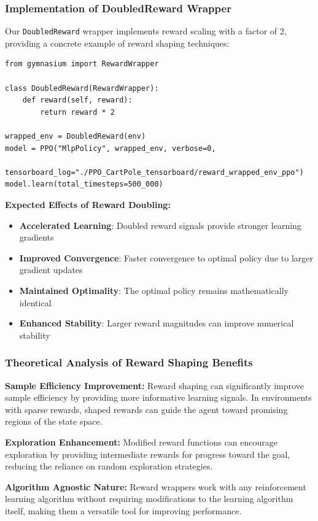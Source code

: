\documentclass[12pt]{article}
\begin{document}
{{{\subsubsection{Implementation of DoubledReward Wrapper}

Our \texttt{DoubledReward} wrapper implements reward scaling with a factor of 2, providing a concrete example of reward shaping techniques:

\begin{verbatim}
from gymnasium import RewardWrapper

class DoubledReward(RewardWrapper):
    def reward(self, reward):
        return reward * 2

wrapped_env = DoubledReward(env)
model = PPO("MlpPolicy", wrapped_env, verbose=0, 
           tensorboard_log="./PPO_CartPole_tensorboard/reward_wrapped_env_ppo")
model.learn(total_timesteps=500_000)
\end{verbatim}

\textbf{Expected Effects of Reward Doubling:}
\begin{itemize}
    \item \textbf{Accelerated Learning}: Doubled reward signals provide stronger learning gradients
    \item \textbf{Improved Convergence}: Faster convergence to optimal policy due to larger gradient updates
    \item \textbf{Maintained Optimality}: The optimal policy remains mathematically identical
    \item \textbf{Enhanced Stability}: Larger reward magnitudes can improve numerical stability
\end{itemize}

\subsubsection{Theoretical Analysis of Reward Shaping Benefits}

\textbf{Sample Efficiency Improvement:}
Reward shaping can significantly improve sample efficiency by providing more informative learning signals. In environments with sparse rewards, shaped rewards can guide the agent toward promising regions of the state space.

\textbf{Exploration Enhancement:}
Modified reward functions can encourage exploration by providing intermediate rewards for progress toward the goal, reducing the reliance on random exploration strategies.

\textbf{Algorithm Agnostic Nature:}
Reward wrappers work with any reinforcement learning algorithm without requiring modifications to the learning algorithm itself, making them a versatile tool for improving performance.

}}}
\end{document}
